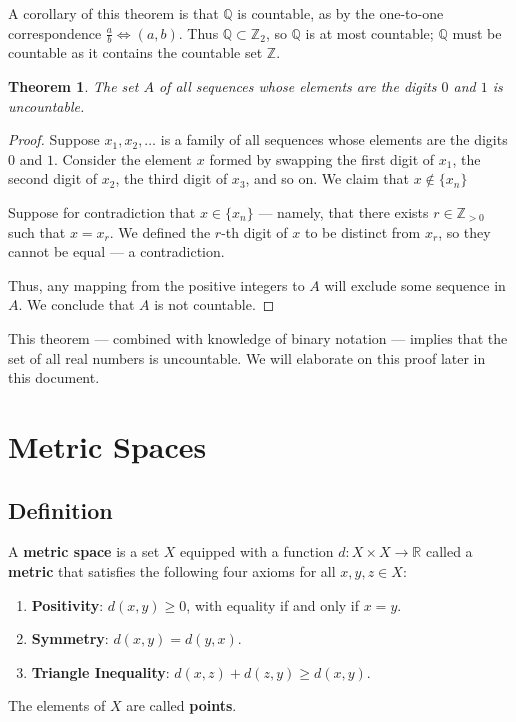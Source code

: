 \documentclass[11pt]{article}
\newtheorem{theorem}{Theorem}
\begin{document}
\newpage

A corollary of this theorem is that $\mathbb{Q}$ is countable, as by the one-to-one correspondence $\tfrac{a}{b} \iff (a, b)$. Thus $\mathbb{Q} \subset \mathbb{Z}_{2}$, so $\mathbb{Q}$ is at most countable; $\mathbb{Q}$ must be countable as it contains the countable set $\mathbb{Z}$.

\begin{theorem}
	The set $A$ of all sequences whose elements are the digits $0$ and $1$ is uncountable.
\end{theorem}
\begin{adjustwidth}{1cm}{}
	\begin{proof}
		Suppose $x_{1}, x_{2}, \ldots$ is a family of all sequences whose elements are the digits $0$ and $1$. Consider the element $x$ formed by swapping the first digit of $x_{1}$, the second digit of $x_{2}$, the third digit of $x_{3}$, and so on. We claim that $x \notin \{ x_{n} \}$
		
		Suppose for contradiction that $x \in \{ x_{n} \}$ --- namely, that there exists $r \in \mathbb{Z}_{> 0}$ such that $x = x_{r}$. We defined the $r$-th digit of $x$ to be distinct from $x_{r}$, so they cannot be equal --- a contradiction.
		
		Thus, any mapping from the positive integers to $A$ will exclude some sequence in $A$. We conclude that $A$ is not countable.
	\end{proof}
\end{adjustwidth}

This theorem --- combined with knowledge of binary notation --- implies that the set of all real numbers is uncountable. We will elaborate on this proof later in this document.


\section{Metric Spaces}


\subsection{Definition}

A \textbf{metric space} is a set $X$ equipped with a function $d : X \times X \to \mathbb{R}$ called a \textbf{metric} that satisfies the following four axioms for all $x, y, z \in X$:
\begin{enumerate}
	\item \textbf{Positivity}: $d(x, y) \ge 0$, with equality if and only if $x = y$.
	\item \textbf{Symmetry}: $d(x, y) = d(y, x)$.
	\item \textbf{Triangle Inequality}: $d(x, z) + d(z, y) \ge d(x, y)$.
\end{enumerate}
The elements of $X$ are called \textbf{points}.
\end{document}
